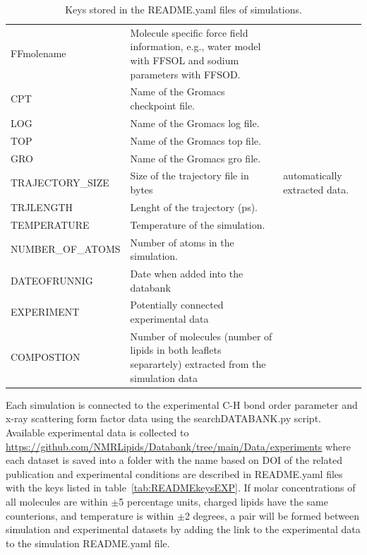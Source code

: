\documentclass[fleqn,10pt]{wlscirep}
\begin{document}
\begin{table}[]
\begin{tabular}{  p{3.5cm}  p{9.5cm}  p{4.0cm} }
    FF{molename} & Molecule specific force field information, e.g., water model with FFSOL and sodium parameters with FFSOD. & \\
    CPT & Name of the Gromacs checkpoint file. & \\
    LOG & Name of the Gromacs log file. & \\
    TOP & Name of the Gromacs top file. & \\
    GRO & Name of the Gromacs gro file. & \\
    \hline
    TRAJECTORY\_SIZE & Size of the trajectory file in bytes & automatically extracted data. \\
    TRJLENGTH & Lenght of the trajectory (ps). & \\
    TEMPERATURE & Temperature of the simulation. & \\
    NUMBER\_OF\_ATOMS & Number of atoms in the simulation. & \\
    DATEOFRUNNIG & Date when added into the databank & \\
    EXPERIMENT & Potentially connected experimental data & \\
    COMPOSTION & Number of molecules (number of lipids in both leaflets separartely) extracted from the simulation data & \\ 
    \end{tabular}
    \caption{Keys stored in the README.yaml files of simulations.}
    \label{tab:READMEkeys}
\end{table}

Each simulation is connected to the experimental C-H bond order parameter and x-ray scattering form factor data using the searchDATABANK.py script. Available experimental data is collected to \url{https://github.com/NMRLipids/Databank/tree/main/Data/experiments} where each dataset is saved into a folder with the name based on DOI of the related publication and experimental conditions are described in README.yaml files with the keys listed in table~\ref{tab:READMEkeysEXP}. If molar concentrations of all molecules are within $\pm$5 percentage units, charged lipids have the same counterions, and temperature is within $\pm$2 degrees, a pair will be formed between simulation and experimental datasets by adding the link to the experimental data to the simulation README.yaml file. 
\end{document}
